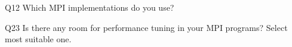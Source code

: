 \begin{description}%
\item{Q12} Which MPI implementations do you use?%
\item{Q23} Is there any room for performance tuning in your MPI programs? Select most suitable one.%
\end{description}%
